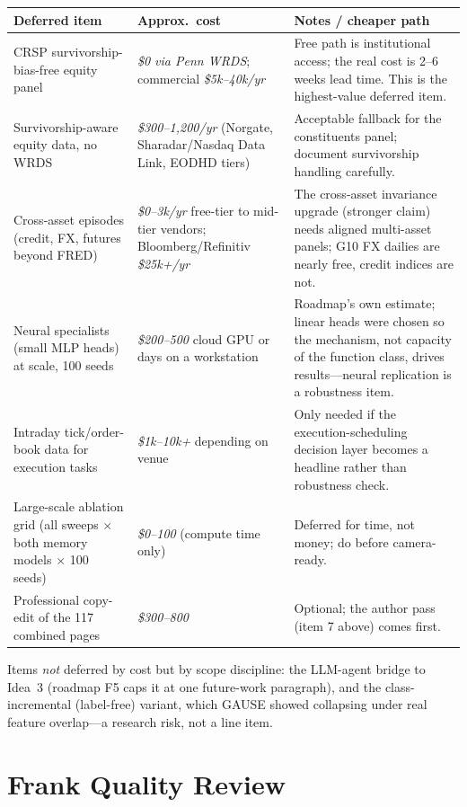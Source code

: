 \documentclass[11pt]{article}
\newcommand{\est}[1]{\textcolor{blue!50!black}{\emph{#1}}}
\begin{document}
\begin{center}\small
\begin{tabular}{@{}p{5.6cm}p{3.4cm}p{6.2cm}@{}}
\toprule
\textbf{Deferred item} & \textbf{Approx.\ cost} & \textbf{Notes / cheaper path}\\
\midrule
CRSP survivorship-bias-free equity panel & \est{\$0 via Penn WRDS}; commercial \est{\$5k--40k/yr} & Free path is institutional access; the real cost is 2--6 weeks lead time. This is the highest-value deferred item.\\
Survivorship-aware equity data, no WRDS & \est{\$300--1{,}200/yr} (Norgate, Sharadar/Nasdaq Data Link, EODHD tiers) & Acceptable fallback for the constituents panel; document survivorship handling carefully.\\
Cross-asset episodes (credit, FX, futures beyond FRED) & \est{\$0--3k/yr} free-tier to mid-tier vendors; Bloomberg/Refinitiv \est{\$25k+/yr} & The cross-asset invariance upgrade (stronger claim) needs aligned multi-asset panels; G10 FX dailies are nearly free, credit indices are not.\\
Neural specialists (small MLP heads) at scale, 100 seeds & \est{\$200--500} cloud GPU or days on a workstation & Roadmap's own estimate; linear heads were chosen so the mechanism, not capacity of the function class, drives results---neural replication is a robustness item.\\
Intraday tick/order-book data for execution tasks & \est{\$1k--10k+} depending on venue & Only needed if the execution-scheduling decision layer becomes a headline rather than robustness check.\\
Large-scale ablation grid (all sweeps $\times$ both memory models $\times$ 100 seeds) & \est{\$0--100} (compute time only) & Deferred for time, not money; do before camera-ready.\\
Professional copy-edit of the 117 combined pages & \est{\$300--800} & Optional; the author pass (item 7 above) comes first.\\
\bottomrule
\end{tabular}
\end{center}

Items \emph{not} deferred by cost but by scope discipline: the LLM-agent bridge to
Idea~3 (roadmap F5 caps it at one future-work paragraph), and the class-incremental
(label-free) variant, which GAUSE showed collapsing under real feature overlap---a
research risk, not a line item.

\section{Frank Quality Review}
\end{document}
